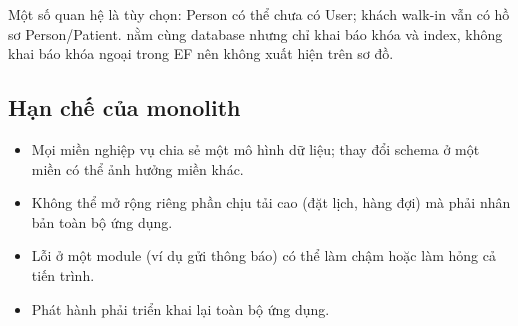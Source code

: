 Một số quan hệ là tùy chọn: Person có thể chưa có User; khách walk-in vẫn có hồ sơ Person/Patient.  nằm cùng database nhưng chỉ khai báo khóa và index, không khai báo khóa ngoại trong EF nên không xuất hiện trên sơ đồ.

\subsection{Hạn chế của monolith}

\begin{itemize}
  \item Mọi miền nghiệp vụ chia sẻ một mô hình dữ liệu; thay đổi schema ở một miền có thể ảnh hưởng miền khác.
  \item Không thể mở rộng riêng phần chịu tải cao (đặt lịch, hàng đợi) mà phải nhân bản toàn bộ ứng dụng.
  \item Lỗi ở một module (ví dụ gửi thông báo) có thể làm chậm hoặc làm hỏng cả tiến trình.
  \item Phát hành phải triển khai lại toàn bộ ứng dụng.
\end{itemize}
